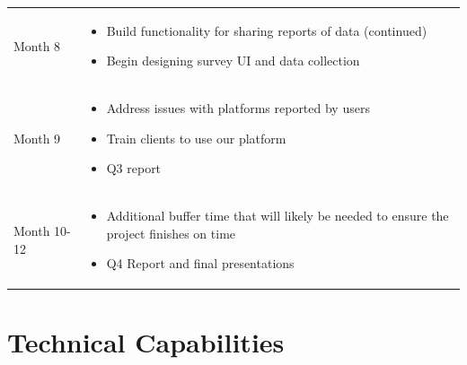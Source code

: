 \begin{table}[H]
\begin{tabularx}{\textwidth}{|l|X|}
\begin{minipage}{\linewidth}
        \vspace{-2pt}
        \end{minipage}\\\hline
      Month 8 & \begin{minipage}{\linewidth}
        \vspace{6pt}
        \begin{itemize}[itemsep=3pt,parsep=-1pt,leftmargin=*]
        \item Build functionality for sharing reports of data (continued)
        \item Begin designing survey UI and data collection
        \end{itemize}
        \vspace{-2pt}
        \end{minipage}\\\hline
      Month 9 & \begin{minipage}{\linewidth}
        \vspace{6pt}
        \begin{itemize}[itemsep=3pt,parsep=-1pt,leftmargin=*]
        \item Address issues with platforms reported by users
        \item Train clients to use our platform
        \item Q3 report
        \end{itemize}
        \vspace{-2pt}
        \end{minipage}\\\hline
      Month 10-12 & \begin{minipage}{\linewidth}
        \vspace{6pt}
        \begin{itemize}[itemsep=3pt,parsep=-1pt,leftmargin=*]
        \item Additional buffer time that will likely be needed to ensure the project finishes on time
        \item Q4 Report and final presentations
        \end{itemize}
        \vspace{-2pt}
        \end{minipage}\\\hline
  \end{tabularx}
\end{table}

\clearpage
\section{Technical Capabilities}

